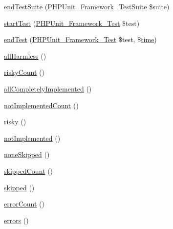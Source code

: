 \begin{DoxyCompactItemize}
\item 
\mbox{\hyperlink{class_p_h_p_unit___framework___test_result_aeec28a4d1328434916ebcdc1ca6b5527}{end\+Test\+Suite}} (\mbox{\hyperlink{class_p_h_p_unit___framework___test_suite}{P\+H\+P\+Unit\+\_\+\+Framework\+\_\+\+Test\+Suite}} \$suite)
\item 
\mbox{\hyperlink{class_p_h_p_unit___framework___test_result_a1a9bddc54f26bb3fb5c2ec9778ea5198}{start\+Test}} (\mbox{\hyperlink{interface_p_h_p_unit___framework___test}{P\+H\+P\+Unit\+\_\+\+Framework\+\_\+\+Test}} \$test)
\item 
\mbox{\hyperlink{class_p_h_p_unit___framework___test_result_a6de65eea8b294795cbc34c4c8cee8546}{end\+Test}} (\mbox{\hyperlink{interface_p_h_p_unit___framework___test}{P\+H\+P\+Unit\+\_\+\+Framework\+\_\+\+Test}} \$test, \$\mbox{\hyperlink{class_p_h_p_unit___framework___test_result_ad0150b710cab9ab24923212cbf226447}{time}})
\item 
\mbox{\hyperlink{class_p_h_p_unit___framework___test_result_aa586846e6484bf4327fb08f1223f17fd}{all\+Harmless}} ()
\item 
\mbox{\hyperlink{class_p_h_p_unit___framework___test_result_aae72562b9950775acd98b2426f3ae042}{risky\+Count}} ()
\item 
\mbox{\hyperlink{class_p_h_p_unit___framework___test_result_a4333ff1fbce25ccb4818a3a50d54c003}{all\+Completely\+Implemented}} ()
\item 
\mbox{\hyperlink{class_p_h_p_unit___framework___test_result_ad4836d96a0d1241ad21da4909cc449ca}{not\+Implemented\+Count}} ()
\item 
\mbox{\hyperlink{class_p_h_p_unit___framework___test_result_a6cef709b6528c204546cb8eaa4a447fa}{risky}} ()
\item 
\mbox{\hyperlink{class_p_h_p_unit___framework___test_result_ae4a527a6dda021d4c6c445e32a998771}{not\+Implemented}} ()
\item 
\mbox{\hyperlink{class_p_h_p_unit___framework___test_result_aa7472a9bbe0ecf45b5c602d130173808}{none\+Skipped}} ()
\item 
\mbox{\hyperlink{class_p_h_p_unit___framework___test_result_ac09b71b767ee2a01c8c178f0ea0beaeb}{skipped\+Count}} ()
\item 
\mbox{\hyperlink{class_p_h_p_unit___framework___test_result_a2b8c90c0ed08895705f7a52d00569740}{skipped}} ()
\item 
\mbox{\hyperlink{class_p_h_p_unit___framework___test_result_af3b127ea2f9d87870d35af0852856ff8}{error\+Count}} ()
\item 
\mbox{\hyperlink{class_p_h_p_unit___framework___test_result_adab0d6dea21cca5e7097732c8a33b8a5}{errors}} ()

\end{DoxyCompactItemize}
